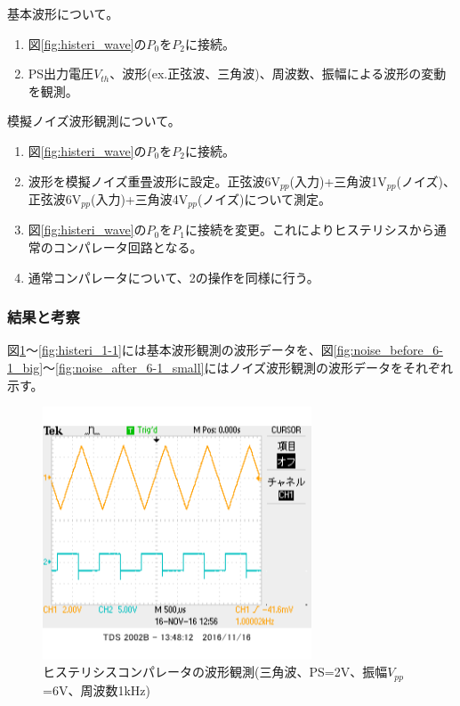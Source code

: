 \documentclass[11pt,a4j]{jsarticle}
\begin{document}
    基本波形について。
    \begin{enumerate}
    \item 図\ref{fig:histeri_wave}の$P_0$を$P_2$に接続。
    \item PS出力電圧$V_{th}$、波形(ex.正弦波、三角波)、周波数、振幅による波形の変動を観測。
    \end{enumerate}
    
    模擬ノイズ波形観測について。
    \begin{enumerate}
    \item 図\ref{fig:histeri_wave}の$P_0$を$P_2$に接続。
    \item 波形を模擬ノイズ重畳波形に設定。正弦波6V$_{pp}$(入力)+三角波1V$_{pp}$(ノイズ)、正弦波6V$_{pp}$(入力)+三角波4V$_{pp}$(ノイズ)について測定。
    \item 図\ref{fig:histeri_wave}の$P_0$を$P_1$に接続を変更。これによりヒステリシスから通常のコンパレータ回路となる。
    \item 通常コンパレータについて、2の操作を同様に行う。
    \end{enumerate}
    
   \subsubsection{結果と考察}
    
    図\ref{fig:histeri_2-1}～\ref{fig:histeri_1-1}には基本波形観測の波形データを、図\ref{fig:noise_before_6-1_big}～\ref{fig:noise_after_6-1_small}にはノイズ波形観測の波形データをそれぞれ示す。
    
    \begin{figure}[htbp]
  \centering
  \includegraphics[width=8cm,clip]{1_2_histeri_Vth2f1V6sankaku_ViVo.png}
  \caption{ヒステリシスコンパレータの波形観測(三角波、PS=2V、振幅$V_{pp}$=6V、周波数1kHz)}
  \label{fig:histeri_2-1}
 \end{figure}
 
\end{document}
